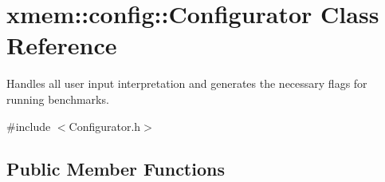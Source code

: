 \hypertarget{classxmem_1_1config_1_1_configurator}{}\section{xmem\+:\+:config\+:\+:Configurator Class Reference}
\label{classxmem_1_1config_1_1_configurator}


Handles all user input interpretation and generates the necessary flags for running benchmarks.  




{\ttfamily \#include $<$Configurator.\+h$>$}

\subsection*{Public Member Functions}
